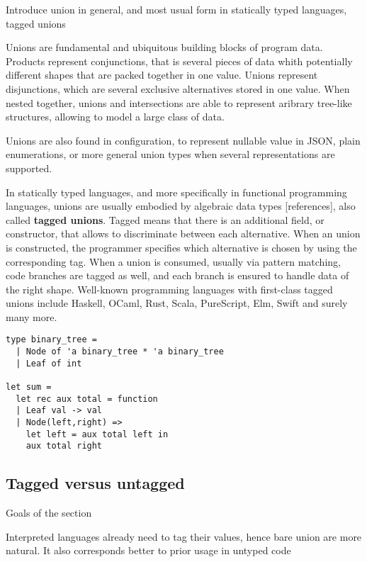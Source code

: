 \documentclass{article}
\begin{document}
Introduce union in general, and most usual form in statically typed languages, tagged unions\vspace{0.5cm}\color{black}

Unions are fundamental and ubiquitous building blocks of program data. Products
represent conjunctions, that is several pieces of data whith potentially
different shapes that are packed together in one value. Unions represent
disjunctions, which are several exclusive alternatives stored in one value. When
nested together, unions and intersections are able to represent aribrary
tree-like structures, allowing to model a large class of data.

Unions are also found in configuration, to represent nullable value in JSON,
plain enumerations, or more general union types when several representations are
supported.

In statically typed languages, and more specifically in functional programming
languages, unions are usually embodied by algebraic data types [references],
also called \textbf{tagged unions}. Tagged means that there is an additional
field, or constructor, that allows to discriminate between each alternative.
When an union is constructed, the programmer specifies which alternative is
chosen by using the corresponding tag. When a union is consumed, usually via
pattern matching, code branches are tagged as well, and each branch is ensured
to handle data of the right shape. Well-known programming languages with
first-class tagged unions include Haskell, OCaml, Rust, Scala, PureScript, Elm,
Swift and surely many more.

\begin{lstlisting}[caption={Example of a binary tree as a tagged union in OCaml}, captionpos=b]
type binary_tree =
  | Node of 'a binary_tree * 'a binary_tree
  | Leaf of int

let sum =
  let rec aux total = function
  | Leaf val -> val
  | Node(left,right) =>
    let left = aux total left in
    aux total right
\end{lstlisting}

\subsection{Tagged versus untagged}
\color{red}Goals of the section

Interpreted languages already need to tag their values, hence bare union are more natural.
It also corresponds better to prior usage in untyped code\vspace{0.5cm}\color{black}
\end{document}
